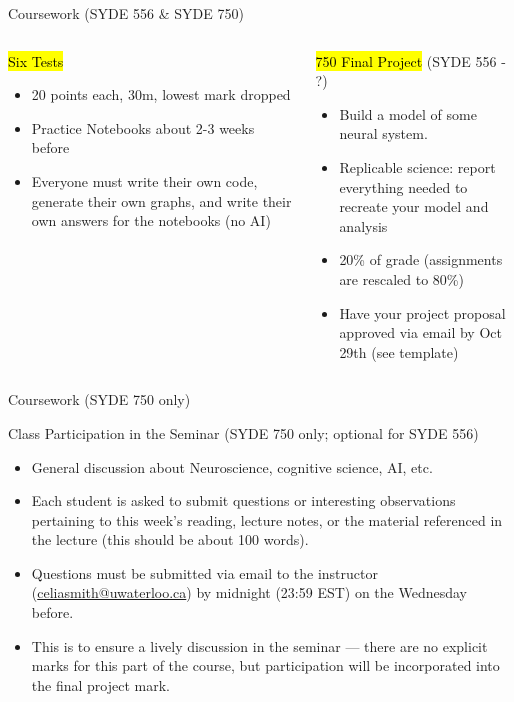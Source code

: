 \documentclass[aspectratio=169]{beamer}
\begin{document}
\begin{frame}{Coursework (SYDE 556 \& SYDE 750)}
	\begin{columns}[t]
		\begin{block}{\hl{Six Tests}}
		\begin{itemize}
				\item 20 points each, 30m, lowest mark dropped
				\item Practice Notebooks about 2-3 weeks before
				\item Everyone must write their own code, generate their own graphs, and write their own answers for the notebooks (no AI)
			\end{itemize}
		\end{block}
		\begin{block}{\hl{750 Final Project} (SYDE 556 - ?)}
			\begin{itemize}
				\item Build a model of some neural system.
				\item Replicable science: report everything needed to recreate your model and analysis
				\item 20\% of grade (assignments are rescaled to 80\%)
				\item Have your project proposal approved via email by Oct 29th (see template)
			\end{itemize}
		\end{block}
	\end{columns}
\end{frame}

\begin{frame}{Coursework (SYDE 750 only)}
	\begin{block}{Class Participation in the Seminar  (SYDE 750 only; optional for SYDE 556)}
	\begin{itemize}
		\item General discussion about Neuroscience, cognitive science, AI, etc.
		\item Each student is asked to submit questions or interesting observations pertaining to this week's reading, lecture notes, or the material referenced in the lecture (this should be about 100 words).
		\item Questions must be submitted via email to the instructor (\url{celiasmith@uwaterloo.ca}) by midnight (23:59 EST) on the Wednesday before.
    \item This is to ensure a lively discussion in the seminar --- there are no explicit marks for this part of the course, but participation will be incorporated into the final project mark.
  \end{itemize}
	\end{block}
\end{frame}
\end{document}
